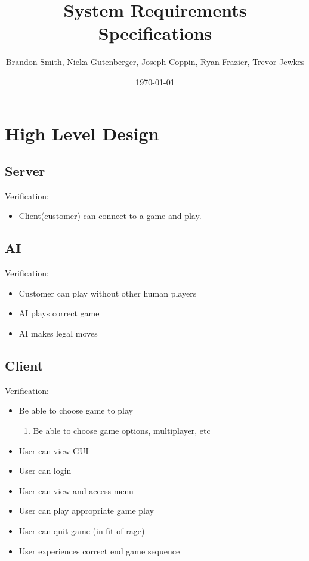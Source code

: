 \documentclass[11pt, titlepage]{article}
\author{Brandon Smith, Nieka Gutenberger, Joseph Coppin, Ryan Frazier, Trevor Jewkes}
\title{System Requirements Specifications}
\date{\today}
\begin{document}
	\maketitle
	\setcounter{tocdepth}{1}
	\section{High Level Design}
	
		\subsection{Server}
		Verification:
		\begin{itemize}
			\item Client(customer) can connect to a game and play.
		\end{itemize}
		
		\subsection{AI}
		Verification:
			\begin{itemize}
				\item Customer can play without other human players
				\item AI plays correct game
				\item AI makes legal moves
			\end{itemize}
			
		\subsection{Client}
			Verification:
			\begin{itemize}
				\item  Be able to choose game to play
				\begin{enumerate}
					\item Be able to choose game options, multiplayer, etc
				\end{enumerate}
				\item User can view GUI
				\item User can login
				\item User can view and access menu
				\item User can play appropriate game play
				\item User can quit game (in fit of rage)
				\item User experiences correct end game sequence
			\end{itemize}
\end{document}
